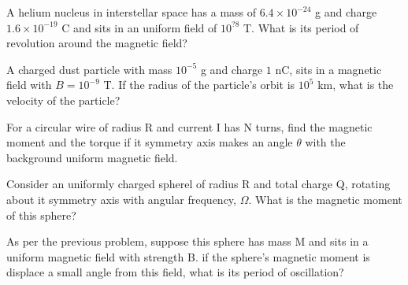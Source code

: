 \documentclass[12pt]{article}
\begin{document}
\pagestyle{empty}

\noindent A helium nucleus in interstellar space has a mass of $6.4 \times 10^{-24}$ g and charge $1.6\times 10^{-19}$ C and sits in an uniform field of $10^{?8}$ T. What is its period of revolution around the magnetic field?
\newpage

\noindent A charged dust particle with mass $10^{-5}$ g and charge $1 $ nC, sits in a magnetic field with $B=10^{-9}$ T.  If the radius of the particle's orbit is $10^5$ km, what is the velocity of the particle?

\newpage

\noindent For a circular wire of radius R and current I has N turns, find the magnetic moment and the torque if
it symmetry axis makes an angle $\theta$ with the background uniform magnetic field. 

\newpage

\noindent Consider an uniformly charged spherel of radius R and total charge Q, rotating about
it symmetry axis with angular frequency, $\Omega$. What is the magnetic moment of this sphere?

\newpage

\noindent As per the previous problem, suppose this sphere has mass M and sits in a uniform magnetic field with strength B.  if the sphere's magnetic moment is displace a small angle from this field, what is its period of oscillation?
\end{document}
